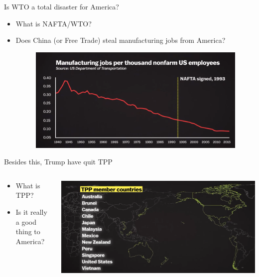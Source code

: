 \documentclass[10pt,hyperref={CJKbookmarks=true},xcolor=dvipsnames,aspectratio=43]{beamer}
\begin{document}
\begin{frame}{Is WTO a total disaster for America?}

\begin{itemize}
\item What is NAFTA/WTO?
\item Does China (or Free Trade) steal manufacturing jobs from America?
\begin{figure}


\includegraphics[scale=0.2]{fig//trump3}

\end{figure}

\end{itemize}
\end{frame}

\begin{frame}{Besides this, Trump have quit TPP}


\begin{columns}[onlytextwidth]
\begin{column}{0.4\textwidth}
\begin{itemize}
\item What is TPP?
\item Is it really a good thing to America?
\end{itemize}

\end{column}
\begin{column}{0.6\textwidth}
\includegraphics[width=\columnwidth]{fig//trump4}
\end{column}
\end{columns}

\end{frame}
\end{document}
